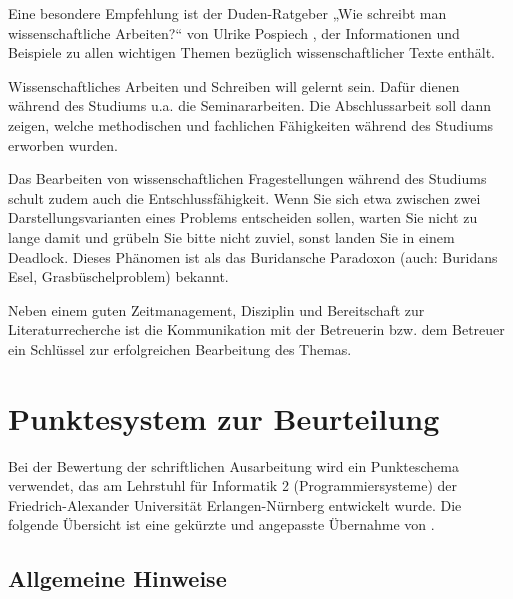 \documentclass[
    fontsize=12pt,
    headings=small,
    parskip=half,           %
    bibliography=totoc,
    numbers=noenddot,       %
    open=any,               %
    ]{scrreprt}
\begin{document}
Eine besondere Empfehlung ist der Duden-Ratgeber „Wie schreibt man wissenschaftliche Arbeiten?“ von Ulrike Pospiech \cite{Posp2012}, der Informationen und Beispiele zu allen wichtigen Themen bezüglich wissenschaftlicher Texte enthält.

Wissenschaftliches Arbeiten und Schreiben will gelernt sein. Dafür dienen während des Studiums u.a. die Seminararbeiten. Die Abschlussarbeit soll dann zeigen, welche methodischen und fachlichen Fähigkeiten während des Studiums erworben wurden. 

Das Bearbeiten von wissenschaftlichen Fragestellungen während des Studiums schult zudem auch die Entschlussfähigkeit. Wenn Sie sich etwa zwischen zwei Darstellungsvarianten eines Problems entscheiden sollen, warten Sie nicht zu lange damit und grübeln Sie bitte nicht zuviel, sonst landen Sie in einem Deadlock. Dieses Phänomen ist als das Buridansche Paradoxon (auch: Buridans Esel, Grasbüschelproblem) \cite{BuridansAss} bekannt.

Neben einem guten Zeitmanagement, Disziplin und Bereitschaft zur Literaturrecherche ist die Kommunikation mit der Betreuerin bzw. dem Betreuer ein Schlüssel zur erfolgreichen Bearbeitung des Themas.


\begin{raggedright}         %
  \printbibliography        %
  \label{sec:literaturverzeichnis}
\end{raggedright}


\appendix
\setcounter{figure}{0}
\renewcommand\thetable{A.\arabic{figure}}
\setcounter{table}{0}
\renewcommand\thetable{A.\arabic{table}}

\chapter*{Punktesystem zur Beurteilung}

Bei der Bewertung der schriftlichen Ausarbeitung wird ein Punkteschema verwendet, das am Lehrstuhl für Informatik 2 (Programmiersysteme) der Friedrich-Alexander Universität Erlangen-Nürnberg entwickelt wurde. Die folgende Übersicht ist eine gekürzte und angepasste Übernahme von \cite{faui2}.

\section*{Allgemeine Hinweise}
\end{document}
